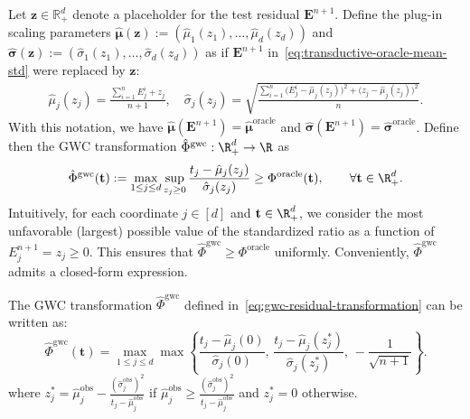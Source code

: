 Let $\mathbf z \in \mathbb{R}^d_+$ denote a placeholder for the test residual $\mathbf{E}^{n+1}$. 
Define the plug-in scaling parameters $\boldsymbol{\hat{\mu}}(\mathbf z) := (\hat{\mu}_1(z_1), \ldots, \hat{\mu}_d(z_d))$ and $\boldsymbol{\hat{\sigma}}(\mathbf z):= (\hat{\sigma}_1(z_1), \ldots, \hat{\sigma}_d(z_d))$ as if $\mathbf{E}^{n+1}$ in~\eqref{eq:transductive-oracle-mean-std} were replaced by $\mathbf z$:
\begin{align} \label{eq:placeholder-mean-std}
\hat{\mu}_j(z_j) = \frac{\sum_{i=1}^{n} {E}^i_j + z_j}{n+1}, 
\quad
\hat{\sigma}_j(z_j) = \sqrt{\frac{\sum_{i=1}^{n} \!\bigl({E}^i_j - \hat{\mu}_j(z_j)\bigr)^2 + \bigl(z_j - \hat{\mu}_j(z_j)\bigr)^2}{n} }.
\end{align}
With this notation, we have $\boldsymbol{\hat{\mu}}(\mathbf{E}^{n+1}) = \hat{\boldsymbol{\mu}}^{\mathrm{oracle}}$ and $\boldsymbol{\hat{\sigma}}(\mathbf{E}^{n+1}) = \hat{\boldsymbol{\sigma}}^{\mathrm{oracle}}$.
Define then the GWC transformation $\hat{\Phi}^{\mathrm{gwc}}: \R^d_+ \to \R$ as
\begin{equation}
\hat{\Phi}^{\mathrm{gwc}}(\mathbf t)
:= 
\max_{1 \le j \le d} 
\sup_{z_j \ge 0} 
\frac{t_j - \hat{\mu}_j(z_j)}{\hat{\sigma}_j(z_j)} \geq \Phi^\mathrm{oracle}(\mathbf t), \qquad\forall \mathbf t \in \R^d_+.
\label{eq:gwc-residual-transformation}
\end{equation}
Intuitively, for each coordinate $j \in [d]$ and $\mathbf t \in \R^d_+$, we consider the most unfavorable (largest) possible value of the standardized ratio as a function of ${E}^{n+1}_j = z_j\geq 0$. 
This ensures that $\hat{\Phi}^{\mathrm{gwc}}\geq \Phi^\mathrm{oracle}$ uniformly.
Conveniently, $\hat{\Phi}^{\mathrm{gwc}}$ admits a closed-form expression.

\begin{lemma}
\label{lem:gwc-rescaling}
The GWC transformation $\hat{\Phi}^{\mathrm{gwc}}$ defined in~\eqref{eq:gwc-residual-transformation} can be written as:
\[
\hat{\Phi}^{\mathrm{gwc}}(\mathbf t)
= 
\max_{1 \le j \le d} 
\max\!\left\{
\frac{t_j - \hat{\mu}_j(0)}{\hat{\sigma}_j(0)},\,
\frac{t_j - \hat{\mu}_j(z_j^*)}{\hat{\sigma}_j(z_j^*)},\,
-\frac{1}{\sqrt{n+1}}
\right\}.
\]
where $z^*_j = \hat\mu^\mathrm{obs}_j - \frac{(\hat{\sigma}^\mathrm{obs}_j)^2}{t_j-\hat\mu^\mathrm{obs}_j}$ if $\hat\mu^\mathrm{obs}_j \geq \frac{(\hat{\sigma}^\mathrm{obs}_j)^2}{t_j-\hat\mu^\mathrm{obs}_j}$ and $z^*_j = 0$ otherwise.
\end{lemma}


